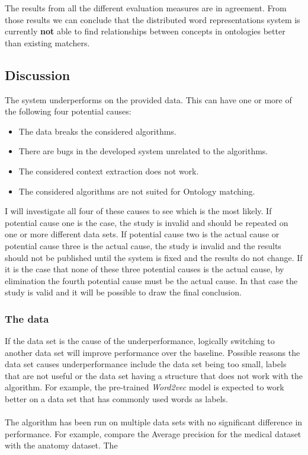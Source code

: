 \documentclass{article}
\begin{document}
 The results from all the different evaluation measures are in agreement. From those results we can conclude that the distributed word representations system is currently \textbf{not} able to find relationships between concepts in ontologies better than existing matchers.

 \subsection{Discussion}
  The system underperforms on the provided data. This can have one or more of the following four potential causes:
  \begin{itemize}
  \item The data breaks the considered algorithms.
  \item There are bugs in the developed system unrelated to the algorithms.
  \item The considered context extraction does not work.
  \item The considered algorithms are not suited for Ontology matching.
  \end{itemize}
  
  I will investigate all four of these causes to see which is the most likely. If potential cause one is the case, the study is invalid and should be repeated on one or more different data sets. If potential cause two is the actual cause or potential cause three is the actual cause, the study is invalid and the results should not be published until the system is fixed and the results do not change. If it is the case that none of these three potential causes is the actual cause, by elimination the fourth potential cause must be the actual cause. In that case the study is valid and it will be possible to draw the final conclusion.
  
  \subsubsection{The data}
  If the data set is the cause of the underperformance, logically switching to another data set will improve performance over the baseline. Possible reasons the data set causes underperformance include the data set being too small, labels that are not useful or the data set having a structure that does not work with the algorithm. For example, the pre-trained \emph{Word2vec} model is expected to work better on a data set that has commonly used words as labels. %
  \paragraph{}
 The algorithm has been run on multiple data sets with no significant difference in performance. For example, compare the Average precision for the medical dataset with the anatomy dataset. The %
 
\end{document}
